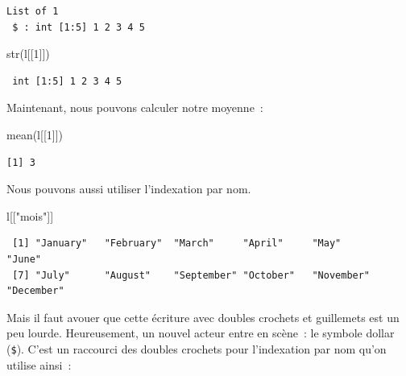 \documentclass[
  letterpaper,
  DIV=11,
  numbers=noendperiod,
  oneside]{scrreprt}
\newenvironment{Shaded}{\begin{snugshade}}{\end{snugshade}}
\newcommand{\DecValTok}[1]{\textcolor[rgb]{0.68,0.00,0.00}{#1}}
\newcommand{\FunctionTok}[1]{\textcolor[rgb]{0.28,0.35,0.67}{#1}}
\newcommand{\NormalTok}[1]{\textcolor[rgb]{0.00,0.23,0.31}{#1}}
\newcommand{\SpecialCharTok}[1]{\textcolor[rgb]{0.37,0.37,0.37}{#1}}
\newcommand{\StringTok}[1]{\textcolor[rgb]{0.13,0.47,0.30}{#1}}
\begin{document}
\begin{verbatim}
List of 1
 $ : int [1:5] 1 2 3 4 5
\end{verbatim}

\begin{Shaded}
\begin{Highlighting}[]
\FunctionTok{str}\NormalTok{(l[[}\DecValTok{1}\NormalTok{]])}
\end{Highlighting}
\end{Shaded}

\begin{verbatim}
 int [1:5] 1 2 3 4 5
\end{verbatim}

Maintenant, nous pouvons calculer notre moyenne~:

\begin{Shaded}
\begin{Highlighting}[]
\FunctionTok{mean}\NormalTok{(l[[}\DecValTok{1}\NormalTok{]])}
\end{Highlighting}
\end{Shaded}

\begin{verbatim}
[1] 3
\end{verbatim}

Nous pouvons aussi utiliser l'indexation par nom.

\begin{Shaded}
\begin{Highlighting}[]
\NormalTok{l[[}\StringTok{"mois"}\NormalTok{]]}
\end{Highlighting}
\end{Shaded}

\begin{verbatim}
 [1] "January"   "February"  "March"     "April"     "May"       "June"     
 [7] "July"      "August"    "September" "October"   "November"  "December" 
\end{verbatim}

Mais il faut avouer que cette écriture avec doubles crochets et
guillemets est un peu lourde. Heureusement, un nouvel acteur entre en
scène~: le symbole dollar (\texttt{\$}). C'est un raccourci des doubles
crochets pour l'indexation par nom qu'on utilise ainsi~:

\begin{Shaded}
\end{Shaded}
\end{document}
